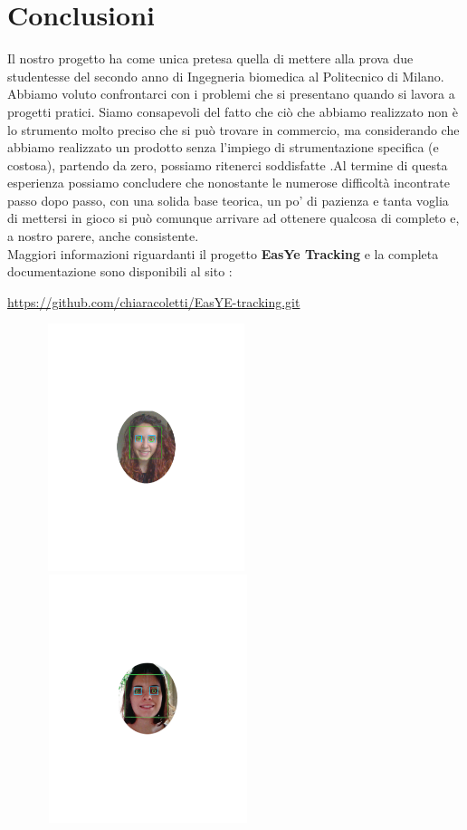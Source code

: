 \documentclass[12pt]{article}
\begin{document}
{\pagebreak

\section{Conclusioni}
Il nostro progetto ha come unica pretesa quella di mettere alla prova due studentesse del secondo anno di Ingegneria biomedica al Politecnico di Milano. Abbiamo voluto confrontarci con i problemi che si presentano quando si lavora a progetti pratici. Siamo consapevoli del fatto che ci\`o che abbiamo realizzato non \`e lo strumento molto preciso che si pu\`o trovare in commercio, ma considerando che abbiamo realizzato un prodotto senza l'impiego di strumentazione specifica (e costosa), partendo da zero, possiamo ritenerci soddisfatte .Al termine di questa esperienza possiamo concludere che nonostante le numerose difficolt\`a incontrate passo dopo passo, con una solida base teorica, un po' di pazienza e tanta voglia di mettersi in gioco si pu\`o comunque arrivare ad ottenere qualcosa di completo e, a nostro parere, anche consistente.
\\
Maggiori informazioni riguardanti il progetto \textbf{EasYe Tracking} e la completa documentazione sono disponibili al sito :

	\hspace{2cm} \url{https://github.com/chiaracoletti/EasYE-tracking.git}
	


\begin{figure}[htbp]
\centering
\includegraphics[width=6cm,height=7.2cm]{im2}%
\qquad\qquad
\includegraphics[width=6.1cm,height=7.25cm]{im}
\end{figure}

}
\end{document}
